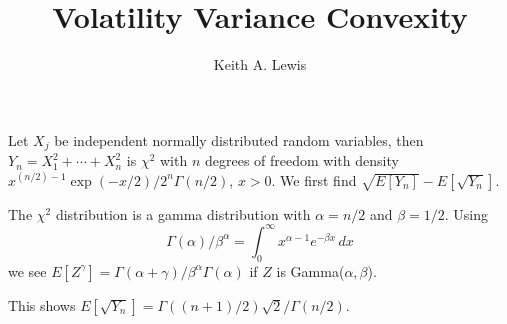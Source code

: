 \documentclass[12pt,fleqn]{amsart}
\begin{document}
\title{Volatility Variance Convexity}
\author{Keith A. Lewis}
\maketitle

Let $X_j$ be independent normally distributed random variables, then
$Y_n = X_1^2 + \cdots + X_n^2$ is $\chi^2$ with $n$ degrees of freedom
with density $x^{(n/2)-1}\exp(-x/2)/2^n\Gamma(n/2)$, $x > 0$. We first
find $\sqrt{E[Y_n]} - E[\sqrt{Y_n}]$.

The $\chi^2$ distribution is a gamma distribution with $\alpha = n/2$
and $\beta = 1/2$.
Using
$$
	\Gamma(\alpha)/\beta^\alpha
		= \int_0^\infty x^{\alpha - 1} e^{-\beta x}\,dx
$$
we see $E[Z^\gamma] = \Gamma(\alpha + \gamma)/\beta^\alpha
\Gamma(\alpha)$ if $Z$ is Gamma($\alpha,\beta$).

This shows $E[\sqrt{Y_n}] = \Gamma((n + 1)/2)\sqrt{2}/\Gamma(n/2)$.
\end{document}
